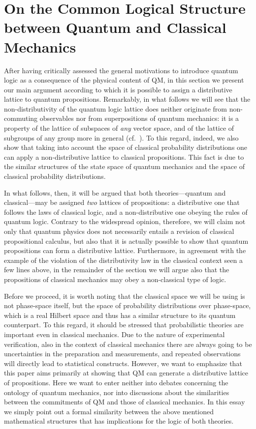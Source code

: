 \documentclass[11pt, executivepaper]{article}
\begin{document}
\section{On the Common Logical Structure between Quantum and Classical Mechanics}
\label{Math}

After having critically assessed the general motivations to introduce quantum logic as a consequence of the physical content of QM, in this section we present our main argument according to which it is possible to assign a distributive lattice to quantum propositions. Remarkably, in what follows we will see that the non-distributivity of the quantum logic lattice does neither originate from non-commuting observables nor from superpositions of quantum mechanics: it is a property of the lattice of subspaces of \emph{any} vector space, and of the lattice of subgroups of any group more in general (cf.\ \cite{Davey:2002}). To this regard, indeed, we also show that taking into account the space of classical probability distributions one can apply a non-distributive lattice to classical propositions. This fact is due to the similar structures of the state space of quantum mechanics and the space of classical probability distributions. 

In what follows, then, it will be argued that both theories---quantum and classical---may be assigned \emph{two} lattices of propositions: a distributive one that follows the laws of classical logic, and a non-distributive one obeying the rules of quantum logic. Contrary to the widespread opinion, therefore, we will claim not only that quantum physics does not necessarily entails a revision of classical propositional calculus, but also that it is actually possible to show that quantum propositions can form a distributive lattice. Furthermore, in agreement with the example of the violation of the distributivity law in the classical context seen a few lines above, in the remainder of the section we will argue also that the propositions of classical mechanics may obey a non-classical type of logic. 

Before we proceed, it is worth noting that the classical space we will be using is not phase-space itself, but the space of probability distributions over phase-space, which is a real Hilbert space and thus has a similar structure to its quantum counterpart. To this regard, it should be stressed that probabilistic theories are important even in classical mechanics. Due to the nature of experimental verification, also in the context of classical mechanics there are always going to be uncertainties in the preparation and measurements, and repeated observations will directly lead to statistical constructs.
However, we want to emphasize that this paper aims primarily at showing that QM can generate a distributive lattice of propositions. Here we want to enter neither into debates concerning the ontology of quantum mechanics, nor into discussions about the similarities between the commitments of QM and those of classical mechanics. In this essay we simply point out a formal similarity between the above mentioned mathematical structures that has implications for the logic of both theories. 
\end{document}

